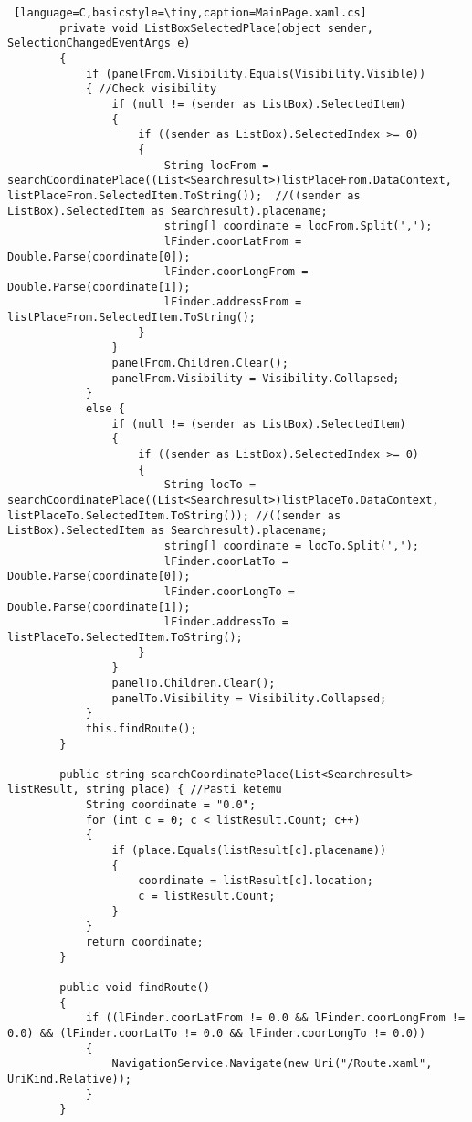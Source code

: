 \begin{lstlisting} [language=C,basicstyle=\tiny,caption=MainPage.xaml.cs]
        private void ListBoxSelectedPlace(object sender, SelectionChangedEventArgs e)
        {
            if (panelFrom.Visibility.Equals(Visibility.Visible))
            { //Check visibility
                if (null != (sender as ListBox).SelectedItem)
                {
                    if ((sender as ListBox).SelectedIndex >= 0)
                    {
                        String locFrom = searchCoordinatePlace((List<Searchresult>)listPlaceFrom.DataContext, listPlaceFrom.SelectedItem.ToString());  //((sender as ListBox).SelectedItem as Searchresult).placename;
                        string[] coordinate = locFrom.Split(',');
                        lFinder.coorLatFrom = Double.Parse(coordinate[0]);
                        lFinder.coorLongFrom = Double.Parse(coordinate[1]);
                        lFinder.addressFrom = listPlaceFrom.SelectedItem.ToString();
                    }
                }
                panelFrom.Children.Clear();
                panelFrom.Visibility = Visibility.Collapsed;
            }
            else {
                if (null != (sender as ListBox).SelectedItem)
                {
                    if ((sender as ListBox).SelectedIndex >= 0)
                    {
                        String locTo = searchCoordinatePlace((List<Searchresult>)listPlaceTo.DataContext, listPlaceTo.SelectedItem.ToString()); //((sender as ListBox).SelectedItem as Searchresult).placename;
                        string[] coordinate = locTo.Split(',');
                        lFinder.coorLatTo = Double.Parse(coordinate[0]);
                        lFinder.coorLongTo = Double.Parse(coordinate[1]);
                        lFinder.addressTo = listPlaceTo.SelectedItem.ToString();
                    }
                }
                panelTo.Children.Clear();
                panelTo.Visibility = Visibility.Collapsed;
            }
            this.findRoute();
        }

        public string searchCoordinatePlace(List<Searchresult> listResult, string place) { //Pasti ketemu
            String coordinate = "0.0";
            for (int c = 0; c < listResult.Count; c++)
            {
                if (place.Equals(listResult[c].placename))
                {
                    coordinate = listResult[c].location;
                    c = listResult.Count;
                }
            }
            return coordinate;
        }

        public void findRoute()
        {
            if ((lFinder.coorLatFrom != 0.0 && lFinder.coorLongFrom != 0.0) && (lFinder.coorLatTo != 0.0 && lFinder.coorLongTo != 0.0))
            {
                NavigationService.Navigate(new Uri("/Route.xaml", UriKind.Relative)); 
            }
        }


\end{lstlisting}
